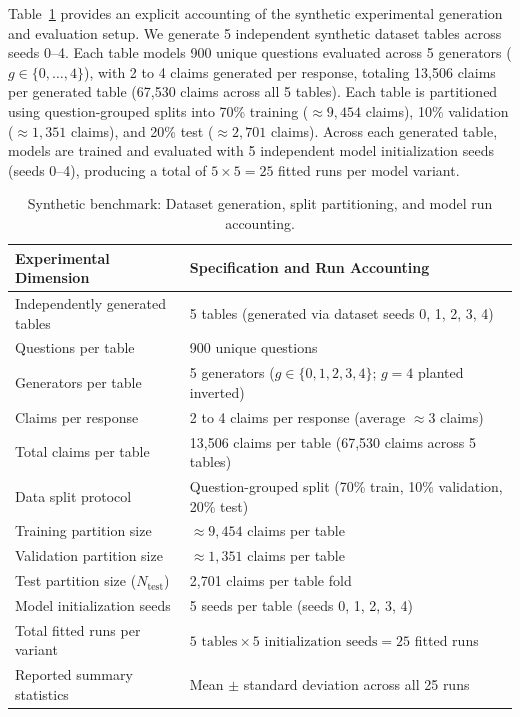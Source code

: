 \documentclass[pdflatex,sn-mathphys,Numbered]{sn-jnl}
\begin{document}
Table~\ref{tab:synthetic_accounting} provides an explicit accounting of the synthetic experimental generation and evaluation setup. We generate 5 independent synthetic dataset tables across seeds 0--4. Each table models 900 unique questions evaluated across 5 generators ($g \in \{0, \dots, 4\}$), with 2 to 4 claims generated per response, totaling 13,506 claims per generated table (67,530 claims across all 5 tables). Each table is partitioned using question-grouped splits into 70\% training ($\approx 9{,}454$ claims), 10\% validation ($\approx 1{,}351$ claims), and 20\% test ($\approx 2{,}701$ claims). Across each generated table, models are trained and evaluated with 5 independent model initialization seeds (seeds 0--4), producing a total of $5 \times 5 = 25$ fitted runs per model variant.

\begin{table}[htbp]
\caption{Synthetic benchmark: Dataset generation, split partitioning, and model run accounting.}\label{tab:synthetic_accounting}
\footnotesize
\setlength{\tabcolsep}{4pt}
\begin{tabular}{@{}ll@{}}
\toprule
\textbf{Experimental Dimension} & \textbf{Specification and Run Accounting} \\
\midrule
Independently generated tables & 5 tables (generated via dataset seeds 0, 1, 2, 3, 4) \\
Questions per table & 900 unique questions \\
Generators per table & 5 generators ($g \in \{0, 1, 2, 3, 4\}$; $g=4$ planted inverted) \\
Claims per response & 2 to 4 claims per response (average $\approx 3$ claims) \\
Total claims per table & 13,506 claims per table (67,530 claims across 5 tables) \\
Data split protocol & Question-grouped split (70\% train, 10\% validation, 20\% test) \\
Training partition size & $\approx 9{,}454$ claims per table \\
Validation partition size & $\approx 1{,}351$ claims per table \\
Test partition size ($N_{\mathrm{test}}$) & 2,701 claims per table fold \\
Model initialization seeds & 5 seeds per table (seeds 0, 1, 2, 3, 4) \\
Total fitted runs per variant & $5 \text{ tables} \times 5 \text{ initialization seeds} = 25$ fitted runs \\
Reported summary statistics & Mean $\pm$ standard deviation across all 25 runs \\
\bottomrule
\end{tabular}
\end{table}
\end{document}
